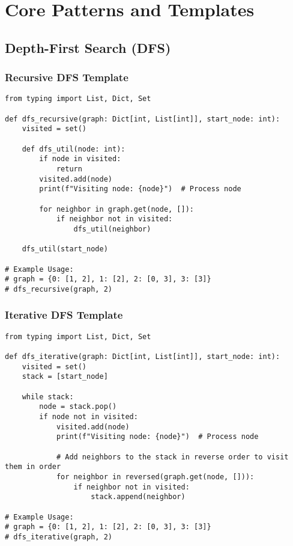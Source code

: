 \documentclass[11pt, a4paper]{article}
\begin{document}
\section{Core Patterns and Templates}

\subsection{Depth-First Search (DFS)}
\subsubsection{Recursive DFS Template}
\begin{verbatim}
from typing import List, Dict, Set

def dfs_recursive(graph: Dict[int, List[int]], start_node: int):
    visited = set()

    def dfs_util(node: int):
        if node in visited:
            return
        visited.add(node)
        print(f"Visiting node: {node}")  # Process node

        for neighbor in graph.get(node, []):
            if neighbor not in visited:
                dfs_util(neighbor)

    dfs_util(start_node)

# Example Usage:
# graph = {0: [1, 2], 1: [2], 2: [0, 3], 3: [3]}
# dfs_recursive(graph, 2)
\end{verbatim}

\subsubsection{Iterative DFS Template}
\begin{verbatim}
from typing import List, Dict, Set

def dfs_iterative(graph: Dict[int, List[int]], start_node: int):
    visited = set()
    stack = [start_node]

    while stack:
        node = stack.pop()
        if node not in visited:
            visited.add(node)
            print(f"Visiting node: {node}")  # Process node

            # Add neighbors to the stack in reverse order to visit them in order
            for neighbor in reversed(graph.get(node, [])):
                if neighbor not in visited:
                    stack.append(neighbor)

# Example Usage:
# graph = {0: [1, 2], 1: [2], 2: [0, 3], 3: [3]}
# dfs_iterative(graph, 2)
\end{verbatim}
\end{document}

